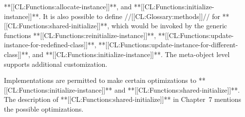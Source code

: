 **[[CL:Functions:allocate-instance]]**,
and **[[CL:Functions:initialize-instance]]**.  It is also possible to define
//[[CL:Glossary:methods]]// for **[[CL:Functions:shared-initialize]]**, which would be invoked by the
generic functions **[[CL:Functions:reinitialize-instance]]**, 
**[[CL:Functions:update-instance-for-redefined-class]]**, 
**[[CL:Functions:update-instance-for-different-class]]**, and 
**[[CL:Functions:initialize-instance]]**.  
The meta-object level supports additional
customization.




                                                                
Implementations are permitted to make certain optimizations to 
**[[CL:Functions:initialize-instance]]** and **[[CL:Functions:shared-initialize]]**.  
The description of **[[CL:Functions:shared-initialize]]** in Chapter~7 mentions the
possible optimizations.














\endsubsection%

